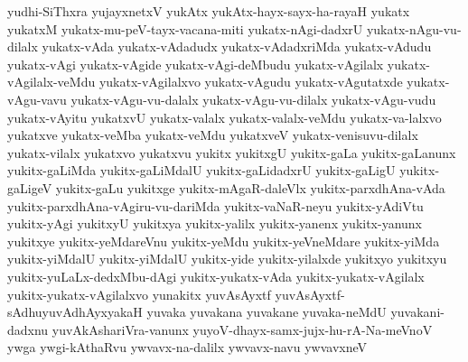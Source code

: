 {yudhi-SiThxra
yujayxnetxV
yukAtx
yukAtx-hayx-sayx-ha-rayaH
yukatx
yukatxM
yukatx-mu-peV-tayx-vacana-miti
yukatx-nAgi-dadxrU
yukatx-nAgu-vu-dilalx
yukatx-vAda
yukatx-vAdadudx
yukatx-vAdadxriMda
yukatx-vAdudu
yukatx-vAgi
yukatx-vAgide
yukatx-vAgi-deMbudu
yukatx-vAgilalx
yukatx-vAgilalx-veMdu
yukatx-vAgilalxvo
yukatx-vAgudu
yukatx-vAgutatxde
yukatx-vAgu-vavu
yukatx-vAgu-vu-dalalx
yukatx-vAgu-vu-dilalx
yukatx-vAgu-vudu
yukatx-vAyitu
yukatxvU
yukatx-valalx
yukatx-valalx-veMdu
yukatx-va-lalxvo
yukatxve
yukatx-veMba
yukatx-veMdu
yukatxveV
yukatx-venisuvu-dilalx
yukatx-vilalx
yukatxvo
yukatxvu
yukitx
yukitxgU
yukitx-gaLa
yukitx-gaLanunx
yukitx-gaLiMda
yukitx-gaLiMdalU
yukitx-gaLidadxrU
yukitx-gaLigU
yukitx-gaLigeV
yukitx-gaLu
yukitxge
yukitx-mAgaR-daleVlx
yukitx-parxdhAna-vAda
yukitx-parxdhAna-vAgiru-vu-dariMda
yukitx-vaNaR-neyu
yukitx-yAdiVtu
yukitx-yAgi
yukitxyU
yukitxya
yukitx-yalilx
yukitx-yanenx
yukitx-yanunx
yukitxye
yukitx-yeMdareVnu
yukitx-yeMdu
yukitx-yeVneMdare
yukitx-yiMda
yukitx-yiMdalU
yukitx-yiMdalU
yukitx-yide
yukitx-yilalxde
yukitxyo
yukitxyu
yukitx-yuLaLx-dedxMbu-dAgi
yukitx-yukatx-vAda
yukitx-yukatx-vAgilalx
yukitx-yukatx-vAgilalxvo
yunakitx
yuvAsAyxtf
yuvAsAyxtf-sAdhuyuvAdhAyxyakaH
yuvaka
yuvakana
yuvakane
yuvaka-neMdU
yuvakani-dadxnu
yuvAkAshariVra-vanunx
yuyoV-dhayx-samx-jujx-hu-rA-Na-meVnoV
ywga
ywgi-kAthaRvu
ywvavx-na-dalilx
ywvavx-navu
ywvavxneV
}
